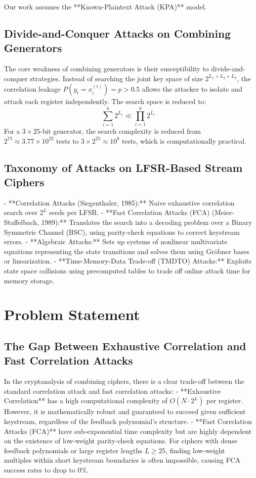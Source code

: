Our work assumes the **Known-Plaintext Attack (KPA)** model.

\subsection{Divide-and-Conquer Attacks on Combining Generators}
The core weakness of combining generators is their susceptibility to divide-and-conquer strategies. Instead of searching the joint key space of size $2^{L_1 + L_2 + L_3}$, the correlation leakage $P(y_t = x_i^{(t)}) = p > 0.5$ allows the attacker to isolate and attack each register independently. The search space is reduced to:
$$\sum_{i=1}^k 2^{L_i} \ll \prod_{i=1}^k 2^{L_i}$$
For a $3 \times 25$-bit generator, the search complexity is reduced from $2^{75} \approx 3.77 \times 10^{22}$ tests to $3 \times 2^{25} \approx 10^8$ tests, which is computationally practical.

\subsection{Taxonomy of Attacks on LFSR-Based Stream Ciphers}
- **Correlation Attacks (Siegenthaler, 1985):** Naive exhaustive correlation search over $2^L$ seeds per LFSR.
- **Fast Correlation Attacks (FCA) (Meier-Staffelbach, 1989):** Translates the search into a decoding problem over a Binary Symmetric Channel (BSC), using parity-check equations to correct keystream errors.
- **Algebraic Attacks:** Sets up systems of nonlinear multivariate equations representing the state transitions and solves them using Gröbner bases or linearization.
- **Time-Memory-Data Trade-off (TMDTO) Attacks:** Exploits state space collisions using precomputed tables to trade off online attack time for memory storage.

\section{Problem Statement}
\label{sec:problem_statement}

\subsection{The Gap Between Exhaustive Correlation and Fast Correlation Attacks}
In the cryptanalysis of combining ciphers, there is a clear trade-off between the standard correlation attack and fast correlation attacks:
- **Exhaustive Correlation** has a high computational complexity of $O(N \cdot 2^L)$ per register. However, it is mathematically robust and guaranteed to succeed given sufficient keystream, regardless of the feedback polynomial's structure.
- **Fast Correlation Attacks (FCA)** have sub-exponential time complexity but are highly dependent on the existence of low-weight parity-check equations. For ciphers with dense feedback polynomials or large register lengths $L \ge 25$, finding low-weight multiples within short keystream boundaries is often impossible, causing FCA success rates to drop to $0\%$.

